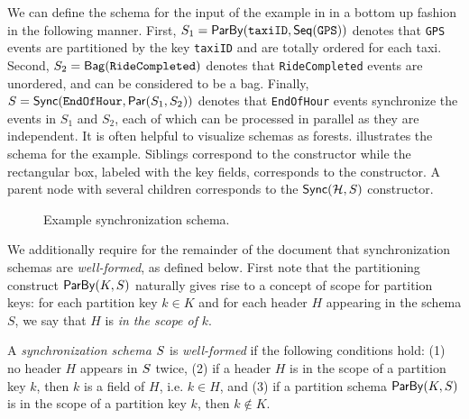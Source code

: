 \begin{example}
\label{45:ex:taxi-distance-schema}
We can define the schema for the input of the example in   in a bottom up fashion in the following manner.
First, $S_1 = \keyby{\texttt{taxiID}}{\seqleaf{\texttt{GPS}}}$ denotes that \texttt{GPS} events are partitioned by the key \texttt{taxiID} and  are totally ordered for each taxi.
Second, $S_2 = \relleaf{\texttt{RideCompleted}}$ denotes that \texttt{RideCompleted} events are unordered, and can be considered to be a bag.
Finally, $S = \hier{\texttt{EndOfHour}}{\parcomp{S_1}{S_2}}$ denotes that \texttt{EndOfHour} events synchronize the events in $S_1$ and $S_2$, each of which can be processed in parallel as they are independent.
It is often helpful to visualize schemas as forests.  illustrates the schema for the example.
Siblings correspond to the  constructor while the rectangular box,
labeled with the key fields, corresponds to the  constructor.
A parent node with several children corresponds to the $\hier{\mathcal{H}}{S}$ constructor.
\end{example}

\begin{figure}[t]
\centering
\scalebox{0.8}{
    \begin{tikzpicture}[sibling distance=11em,
      every node/.style = {shape=rectangle,
        rounded corners,
        draw, align=center}]]
      \node { \TopSchemaNode{\texttt{EndOfHour}} }
        child {
            \SchemaNode{\seqleaf{\texttt{GPS}}}{s2}
        }
        child {
            \SchemaNode{\relleaf{\texttt{RideCompleted}} }{s3}
        };
      \KeyByNode{\texttt{taxiID}}{k1}{s2}{s2};
    \end{tikzpicture}
}
\caption{Example synchronization schema.}
\label{45:fig:example-schema}
\end{figure}

We additionally require for the remainder of the document that synchronization schemas are \emph{well-formed}, as defined below. First note that the partitioning construct $\keyby{K}{S}$ naturally gives rise to a concept of
scope for partition keys: for each partition key $k \in K$ and for each
header $H$ appearing in the schema $S$,
we say that $H$ is \emph{in the scope of} $k$.
\begin{definition}
\label{45:def:well-formed-sync-schema}
A \emph{synchronization schema} $\ss$ is \emph{well-formed} if the following conditions hold: (1) no header $H$ appears in $\ss$ twice,
    (2) if a header $H$ is in the scope of a partition key $k$, then $k$ is a field of $H$, i.e. $k \in H$, and
    (3) if a partition schema $\keyby{K}{S}$ is in the scope of a partition key $k$, then $k \not \in K$.
    \end{definition}

